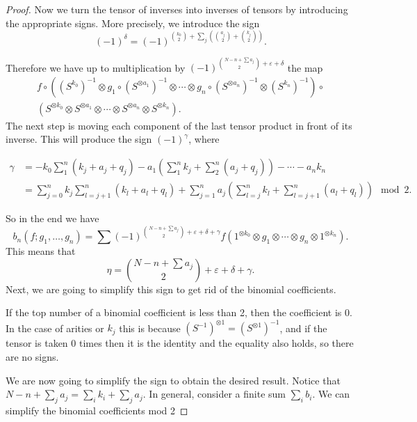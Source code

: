 \documentclass[Thesis.tex]{subfiles}
\begin{document}
\begin{proof}
 Now we turn the tensor of inverses into inverses of tensors by introducing the appropriate signs. More precisely, we introduce the sign
 \begin{equation}\label{delta}
 (-1)^{\delta}=(-1)^{\binom{k_0}{2}+\sum_j\left(\binom{a_j}{2}+\binom{k_j}{2}\right)}.
  \end{equation}
 
  
Therefore we have up to multiplication by $(-1)^{\binom{N-n+\sum a_j}{2}+\varepsilon+\delta}$ the map
\begin{gather*}
 f\circ((S^{k_0})^{-1}\otimes  g_1\circ (S^{\otimes a_1})^{-1}\otimes\cdots \otimes  g_n\circ (S^{\otimes a_n})^{-1}\otimes  (S^{k_n})^{-1})\circ\\ (S^{\otimes k_0}\otimes S^{\otimes a_1}\otimes\cdots\otimes S^{\otimes a_n}\otimes S^{\otimes k_n}).
 \end{gather*}
 The next step is moving each component of the last tensor product in front of its inverse. This will produce the sign $(-1)^\gamma$, where
 
 \begin{align}\label{gammasign}
 \gamma&=-k_0\sum_1^n(k_j+a_j+q_j)-a_1\left(\sum_1^n k_j+\sum_2^n (a_j+q_j)\right)-\cdots -a_nk_n\\
 &= \sum_{j=0}^nk_j\sum_{l=j+1}^n(k_l+a_l+q_l)+\sum_{j=1}^na_j\left(\sum_{l=j}^nk_l+\sum_{l=j+1}^n(a_l+q_l)\right)\mod 2\nonumber.
 \end{align}
 

 
 So in the end we have
 \[
 b_n(f;g_1,\dots,g_n)=\sum(-1)^{\binom{N-n+\sum a_j}{2}+\varepsilon+\delta+\gamma}f(1^{\otimes k_0}\otimes g_1\otimes\cdots\otimes g_n\otimes 1^{\otimes k_n}).
 \]
This means that 
 \[\eta=\binom{N-n+\sum a_j}{2}+\varepsilon+\delta+\gamma.\]
  Next, we are going to simplify this sign to get rid of the binomial coefficients.
 
 \begin{remark}
If the top number of a binomial coefficient is less than 2, then the coefficient is 0. In the case of arities or $k_j$ this is because $(S^{-1})^{\otimes 1}=(S^{\otimes 1})^{-1}$, and if the tensor is taken 0 times then it is the identity and the equality also holds, so there are no signs.
\end{remark}


We are now going to simplify the sign to obtain the desired result. Notice that $N-n+\sum_j a_j=\sum_i k_i +\sum_j a_j$. In general, consider a finite sum $\sum_i b_i$. We can simplify the binomial coefficients mod 2


\end{proof}
\end{document}
